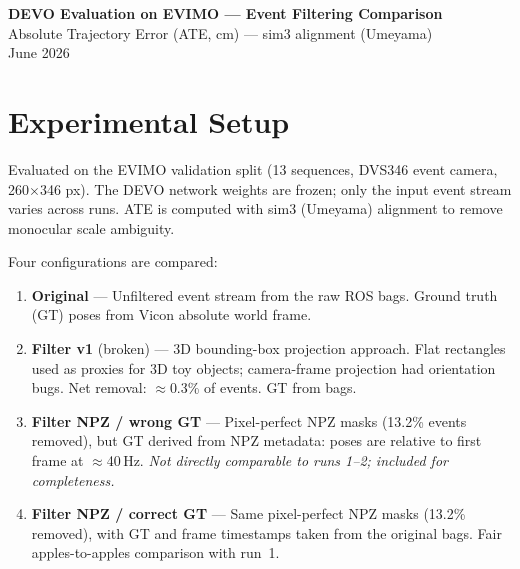 \documentclass[a4paper, 10pt]{article}
\begin{document}
\begin{center}
  {\LARGE\bfseries DEVO Evaluation on EVIMO --- Event Filtering Comparison}\\[0.6em]
  {\large Absolute Trajectory Error (ATE, cm) --- sim3 alignment (Umeyama)}\\[0.2em]
  {\small June 2026}
\end{center}

\vspace{0.5em}

\section*{Experimental Setup}

\noindent
Evaluated on the EVIMO validation split (13 sequences, DVS346 event camera, 260$\times$346 px).
The DEVO network weights are frozen; only the input event stream varies across runs.
ATE is computed with sim3 (Umeyama) alignment to remove monocular scale ambiguity.

\medskip
\noindent Four configurations are compared:

\begin{enumerate}
  \item \textbf{Original} --- Unfiltered event stream from the raw ROS bags. Ground truth (GT) poses from Vicon absolute world frame.

  \item \textbf{Filter v1} (broken) --- 3D bounding-box projection approach. Flat rectangles used as proxies for 3D toy objects; camera-frame projection had orientation bugs. Net removal: $\approx$0.3\% of events. GT from bags.

  \item \textbf{Filter NPZ / wrong GT} --- Pixel-perfect NPZ masks (13.2\% events removed), but GT derived from NPZ metadata: poses are relative to first frame at $\approx$40\,Hz. \emph{Not directly comparable to runs 1--2; included for completeness.}

  \item \textbf{Filter NPZ / correct GT} --- Same pixel-perfect NPZ masks (13.2\% removed), with GT and frame timestamps taken from the original bags. Fair apples-to-apples comparison with run~1.
\end{enumerate}

\end{document}
